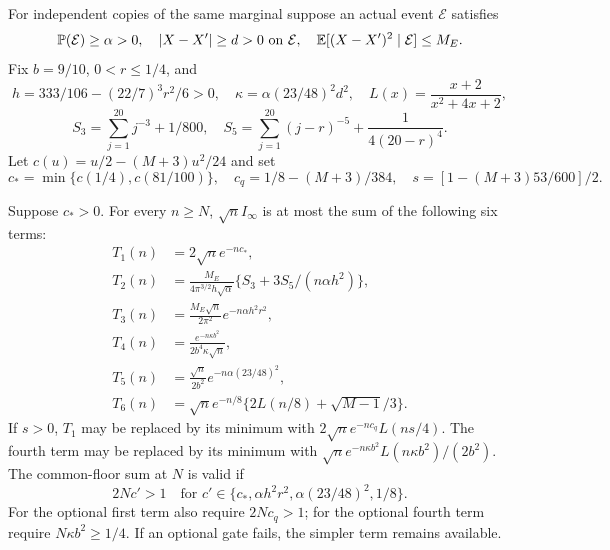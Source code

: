 For independent copies of the same marginal suppose an actual event
$\mathcal E$ satisfies
\[
 \mathbb P(\mathcal E)\ge\alpha>0,\quad |X-X'|\ge d>0\text{ on }\mathcal E,
 \quad\mathbb E[(X-X')^2\mid\mathcal E]\le M_E.
\]
Fix $b=9/10$, $0<r\le1/4$, and
\[
 h=333/106-(22/7)^3r^2/6>0,\quad
 \kappa=\alpha(23/48)^2d^2,\quad L(x)=\frac{x+2}{x^2+4x+2},
\]
\[
 S_3=\sum_{j=1}^{20}j^{-3}+1/800,\quad
 S_5=\sum_{j=1}^{20}(j-r)^{-5}+\frac1{4(20-r)^4}.
\]
Let $c(u)=u/2-(M+3)u^2/24$ and set
\[
 c_* =\min\{c(1/4),c(81/100)\},\quad
 c_q=1/8-(M+3)/384,\quad s=[1-(M+3)53/600]/2.
\]
\begin{proposition}\label{v7fourier:high}
Suppose $c_*>0$. For every $n\ge N$, $\sqrt n I_\infty$ is at most
the sum of the following six terms:
\begin{align*}
 T_1(n)&=2\sqrt n e^{-nc_*},\\
 T_2(n)&=\frac{M_E}{4\pi^{3/2}h\sqrt\alpha}
       \{S_3+3S_5/(n\alpha h^2)\},\\
 T_3(n)&=\frac{M_E\sqrt n}{2\pi^2}e^{-n\alpha h^2r^2},\\
 T_4(n)&=\frac{e^{-n\kappa b^2}}{2b^4\kappa\sqrt n},\\
 T_5(n)&=\frac{\sqrt n}{2b^2}e^{-n\alpha(23/48)^2},\\
 T_6(n)&=\sqrt n e^{-n/8}\{2L(n/8)+\sqrt{M-1}/3\}.
\end{align*}
If $s>0$, $T_1$ may be replaced by its minimum with
$2\sqrt n e^{-nc_q}L(ns/4)$. The fourth term may be replaced by
its minimum with $\sqrt n e^{-n\kappa b^2}L(n\kappa b^2)/(2b^2)$.
The common-floor sum at $N$ is valid if
\[
 2Nc'>1\quad\text{for }c'\in\{c_*,\alpha h^2r^2,
                      \alpha(23/48)^2,1/8\}.
\]
For the optional first term also require $2Nc_q>1$; for the optional
fourth term require $N\kappa b^2\ge1/4$. If an optional gate fails,
the simpler term remains available.
\end{proposition}
